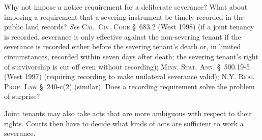 Why not impose a notice requirement for a deliberate severance? What about
imposing a requirement that a severing instrument be timely recorded in the
public land records? \emph{See} \textsc{Cal. Civ. Code} \S~683.2 (West 1998) (if
a joint tenancy is recorded, severance is only effective against the
non-severing tenant if the severance is recorded either before the severing
tenant's death or, in limited circumstances, recorded within seven days after
death; the severing tenant's right of survivorship is cut off even without
recording); \textsc{Minn. Stat. Ann.} \S~500.19-5 (West 1997) (requiring
recording to make unilateral severance valid); \textsc{N.Y. Real Prop. Law}
\S~240-c(2) (similar). Does a recording requirement solve the problem of
surprise?

Joint tenants may also take acts that are more ambiguous with respect to their
rights. Courts then have to decide what kinds of acts are sufficient to work a
severance.

